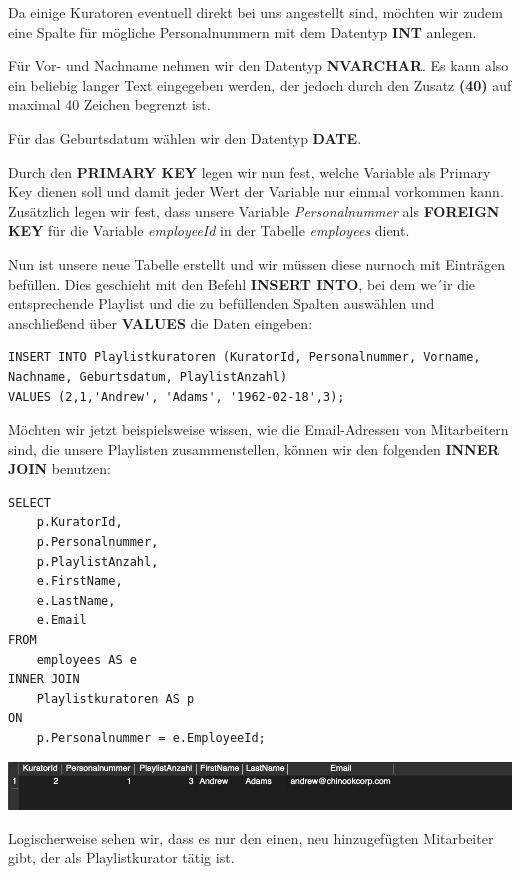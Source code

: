 \documentclass[
]{book}
\begin{document}
Da einige Kuratoren eventuell direkt bei uns angestellt sind, möchten wir zudem eine Spalte für mögliche Personalnummern mit dem Datentyp \textbf{INT} anlegen.

Für Vor- und Nachname nehmen wir den Datentyp \textbf{NVARCHAR}. Es kann also ein beliebig langer Text eingegeben werden, der jedoch durch den Zusatz \textbf{(40)} auf maximal 40 Zeichen begrenzt ist.

Für das Geburtsdatum wählen wir den Datentyp \textbf{DATE}.

Durch den \textbf{PRIMARY KEY} legen wir nun fest, welche Variable als Primary Key dienen soll und damit jeder Wert der Variable nur einmal vorkommen kann. Zusätzlich legen wir fest, dass unsere Variable \emph{Personalnummer} als \textbf{FOREIGN KEY} für die Variable \emph{employeeId} in der Tabelle \emph{employees} dient.

Nun ist unsere neue Tabelle erstellt und wir müssen diese nurnoch mit Einträgen befüllen. Dies geschieht mit den Befehl \textbf{INSERT INTO}, bei dem we´ir die entsprechende Playlist und die zu befüllenden Spalten auswählen und anschließend über \textbf{VALUES} die Daten eingeben:

\begin{verbatim}
INSERT INTO Playlistkuratoren (KuratorId, Personalnummer, Vorname, Nachname, Geburtsdatum, PlaylistAnzahl)
VALUES (2,1,'Andrew', 'Adams', '1962-02-18',3);
\end{verbatim}

Möchten wir jetzt beispielsweise wissen, wie die Email-Adressen von Mitarbeitern sind, die unsere Playlisten zusammenstellen, können wir den folgenden \textbf{INNER JOIN} benutzen:

\begin{verbatim}
SELECT
    p.KuratorId,
    p.Personalnummer,
    p.PlaylistAnzahl,
    e.FirstName,
    e.LastName,
    e.Email
FROM
    employees AS e
INNER JOIN
    Playlistkuratoren AS p
ON
    p.Personalnummer = e.EmployeeId;
\end{verbatim}

\includegraphics[width=10.41667in,height=\textheight]{img-CREATE1.png}

Logischerweise sehen wir, dass es nur den einen, neu hinzugefügten Mitarbeiter gibt, der als Playlistkurator tätig ist.

  
\end{document}
